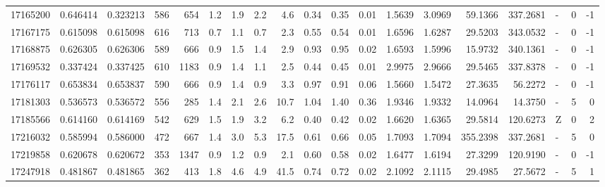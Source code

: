 \begin{tabular}{rrrrrrrrrrrrrrrrlrr}
  17165200 & 0.646414 &   0.323213 &  586 &  654 &      1.2 &      1.9 &     2.2 &      4.6 &       0.34 &        0.35 &        0.01 &  1.5639 &  3.0969 &   59.1366 &  337.2681 &             - &        0 &         -1 \\
  17167175 & 0.615098 &   0.615098 &  616 &  713 &      0.7 &      1.1 &     0.7 &      2.3 &       0.55 &        0.54 &        0.01 &  1.6596 &  1.6287 &   29.5203 &  343.0532 &             - &        0 &         -1 \\
  17168875 & 0.626305 &   0.626306 &  589 &  666 &      0.9 &      1.5 &     1.4 &      2.9 &       0.93 &        0.95 &        0.02 &  1.6593 &  1.5996 &   15.9732 &  340.1361 &             - &        0 &         -1 \\
  17169532 & 0.337424 &   0.337425 &  610 & 1183 &      0.9 &      1.4 &     1.1 &      2.5 &       0.44 &        0.45 &        0.01 &  2.9975 &  2.9666 &   29.5465 &  337.8378 &             - &        0 &         -1 \\
  17176117 & 0.653834 &   0.653837 &  590 &  666 &      0.9 &      1.4 &     0.9 &      3.3 &       0.97 &        0.91 &        0.06 &  1.5660 &  1.5472 &   27.3635 &   56.2272 &             - &        0 &         -1 \\
  17181303 & 0.536573 &   0.536572 &  556 &  285 &      1.4 &      2.1 &     2.6 &     10.7 &       1.04 &        1.40 &        0.36 &  1.9346 &  1.9332 &   14.0964 &   14.3750 &             - &        5 &          0 \\
  17185566 & 0.614160 &   0.614169 &  542 &  629 &      1.5 &      1.9 &     3.2 &      6.2 &       0.40 &        0.42 &        0.02 &  1.6620 &  1.6365 &   29.5814 &  120.6273 &             Z &        0 &          2 \\
  17216032 & 0.585994 &   0.586000 &  472 &  667 &      1.4 &      3.0 &     5.3 &     17.5 &       0.61 &        0.66 &        0.05 &  1.7093 &  1.7094 &  355.2398 &  337.2681 &             - &        5 &          0 \\
  17219858 & 0.620678 &   0.620672 &  353 & 1347 &      0.9 &      1.2 &     0.9 &      2.1 &       0.60 &        0.58 &        0.02 &  1.6477 &  1.6194 &   27.3299 &  120.9190 &             - &        0 &         -1 \\
  17247918 & 0.481867 &   0.481865 &  362 &  413 &      1.8 &      4.6 &     4.9 &     41.5 &       0.74 &        0.72 &        0.02 &  2.1092 &  2.1115 &   29.4985 &   27.5672 &             - &        5 &          1 \\

\end{tabular}
